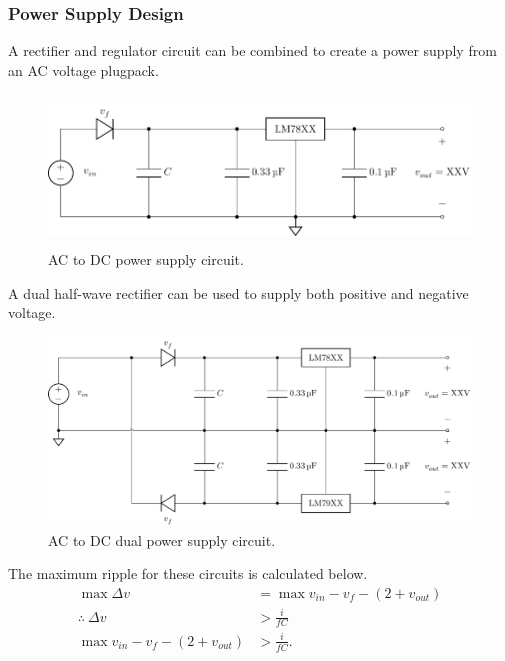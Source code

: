\documentclass{article}
\begin{document}
\subsubsection{Power Supply Design}
A rectifier and regulator circuit can be combined to create a power
supply from an AC voltage plugpack.
\begin{figure}[H]
    \centering
    \includegraphics[height = 4cm, keepaspectratio = true]{figures/power_supply.pdf}
    \caption{AC to DC power supply circuit.}
\end{figure}
A dual half-wave rectifier can be used to supply both positive and negative voltage.
\begin{figure}[H]
    \centering
    \includegraphics[width = \linewidth, keepaspectratio = true]{figures/dual_power_supply.pdf}
    \caption{AC to DC dual power supply circuit.}
\end{figure}
The maximum ripple for these circuits is calculated below.
\begin{align*}
    \max{\Delta v}                                  & = \max{v_{in}} - v_f - \left( 2 + v_{out} \right) \\
    \therefore\: \Delta v                           & > \frac{i}{fC}                                    \\
    \max{v_{in}} - v_f - \left( 2 + v_{out} \right) & > \frac{i}{fC}.
\end{align*}
\end{document}
